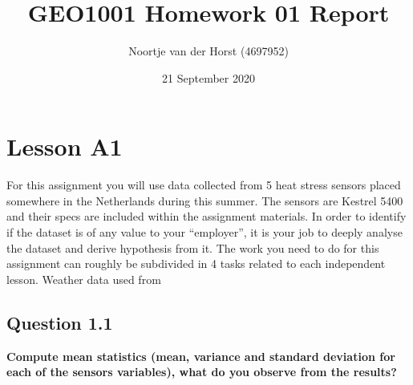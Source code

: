 \documentclass{report}
\title{GEO1001 Homework 01 Report}
\author{Noortje van der Horst (4697952)}
\date{21 September 2020}
\begin{document}
	
	\maketitle
	
	\section{Lesson A1}
	For this assignment you will use data collected from 5 heat stress sensors placed somewhere in the Netherlands during this summer. The sensors are Kestrel 5400 and their specs are included within the assignment materials. In order to identify if the dataset is of any value to your “employer”, it is your job to deeply analyse the dataset and derive hypothesis from it. The work you need to do for this assignment can roughly be subdivided in 4 tasks related to each independent lesson. Weather data used from \cite{Maiullari2020}
	
	
	\subsection{Question 1.1}
	\textbf{Compute mean statistics (mean, variance and standard deviation for each of the sensors variables), what do you observe from the results?}
	
\end{document}
